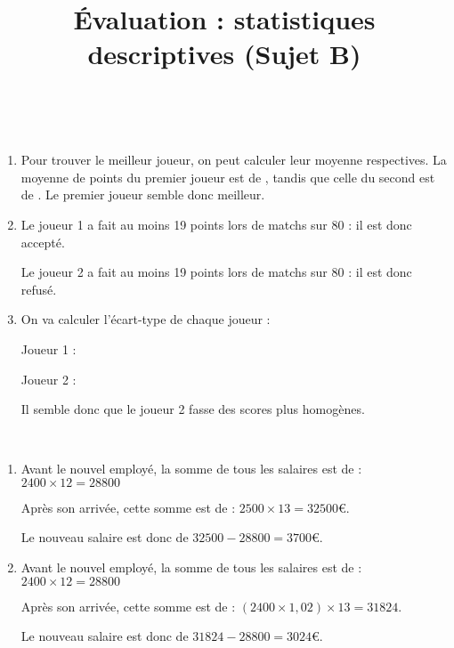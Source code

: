 \documentclass[
	classe=$2^{de}$,
	headerTitle=Évaluation\space Chapitre\space 4
]{évaluation}
\begin{document}
\begin{exercice}\

	\begin{enumerate}
		\item Pour trouver le meilleur joueur, on peut calculer leur moyenne respectives. La moyenne de points du premier joueur est de , tandis que celle du second est de . Le premier joueur semble donc meilleur.
		\item Le joueur 1 a fait au moins 19 points lors de  matchs sur 80 : il est donc accepté.

		      Le joueur 2 a fait au moins 19 points lors de  matchs sur 80 : il est donc refusé.
		\item On va calculer l'écart-type de chaque joueur :

		      Joueur 1 : 

		      Joueur 2 : 

		      Il semble donc que le joueur 2 fasse des scores plus homogènes.
	\end{enumerate}
\end{exercice}

\begin{exercice}\

	\begin{enumerate}
		\item Avant le nouvel employé, la somme de tous les salaires est de : $2400×12 = 28800$

		      Après son arrivée, cette somme est de : $2500×13 = 32500€$.

		      Le nouveau salaire est donc de $32500-28800 = 3700€$.
		\item Avant le nouvel employé, la somme de tous les salaires est de : $2400×12 = 28800$

		      Après son arrivée, cette somme est de : $(2400×1,02)×13 = 31824$.

		      Le nouveau salaire est donc de $31824-28800 = 3024€$.
	\end{enumerate}
\end{exercice}

\newpage
\title{Évaluation : statistiques descriptives (Sujet B)}
\setcounter{exercice}{1}
\end{document}

